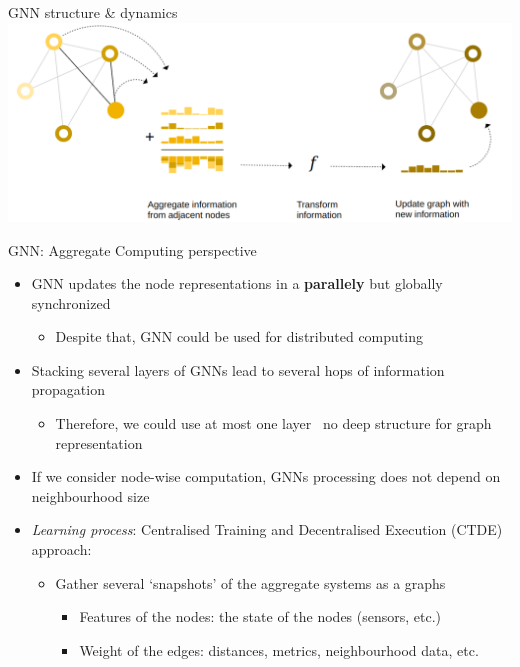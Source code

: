 \documentclass[presentation, 9pt]{beamer}\mode<presentation>{\usetheme{AMSBolognaFC}}
\begin{document}
\begin{frame}[fragile]{GNN structure \& dynamics}
	\centering
	\includegraphics[width=\textwidth]{img/example-gnn.png}

\end{frame}
\begin{frame}{GNN: Aggregate Computing perspective}
	\begin{itemize}
			\item GNN updates the node representations in a \textbf{parallely} {\textcolor{darkcyan}\faThumbsUp} but globally synchronized {\textcolor{bolognafcred}\faThumbsDown}
			\begin{itemize}
				\item Despite that, GNN could be used for distributed computing {\textcolor{darkcyan}\faThumbsUp}
			\end{itemize} 
			\item Stacking several layers of GNNs lead to several hops of information propagation
			\begin{itemize}
				\item Therefore, we could use at most one layer \faArrowRight \, no deep structure for graph representation
			\end{itemize}
			\item If we consider node-wise computation, GNNs processing does not depend on neighbourhood size {\textcolor{darkcyan}\faThumbsUp}
			\item \emph{Learning process}: Centralised Training and Decentralised Execution (CTDE) approach:
			\begin{itemize}
				\item Gather several `snapshots' of the aggregate systems as a graphs
				\begin{itemize}
					\item Features of the nodes: the state of the nodes (sensors, etc.)
					\item Weight of the edges: distances, metrics, neighbourhood data, etc.
				\end{itemize}

\end{itemize}
\end{itemize}
\end{frame}
\end{document}

